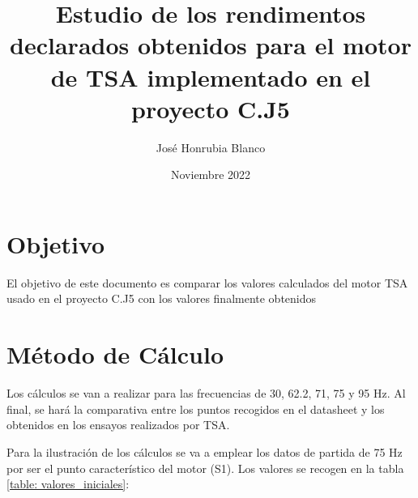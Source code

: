 \documentclass[12pt]{article}
\title{Estudio de los rendimentos declarados  obtenidos para el motor de TSA implementado en el proyecto C.J5}
\author{José Honrubia Blanco}
\date{Noviembre 2022}
\begin{document}
\section{Objetivo}
El objetivo de este documento es comparar los valores calculados del motor TSA usado en el proyecto C.J5 con los valores finalmente obtenidos

\section{Método de Cálculo}
Los cálculos se van a realizar para las frecuencias de 30, 62.2, 71, 75 y 95 Hz. Al final, se hará la comparativa entre los puntos recogidos en el datasheet y los obtenidos en los ensayos realizados por TSA.

Para la ilustración de los cálculos se va a emplear los datos de partida de 75 Hz por ser el punto característico del motor (S1). Los valores se recogen en la tabla \ref{table: valores_iniciales}:
\end{document}
